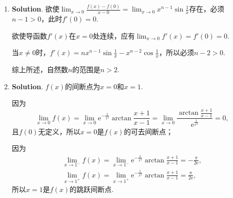 \documentclass[../main.tex]{subfiles}
\begin{document}
\begin{enumerate}
    \item \textbf{Solution}. 欲使$\lim_{x\to0}\frac{f(x)-f(0)}{x-0}=\lim_{x\to0}x
                  ^{n-1}\sin\frac{1}{x}$存在，必须$n-1>0$，此时$f'(0)=0$.

          欲使导函数$f'(x)$在$x=0$处连续，应有$\lim_{x\to0}f'(x)=f'(0)=0$.

          当$x\neq0$时，$f'(x)=nx^{n-1}\sin\frac{1}{x}-x^{n-2}\cos\frac{1}{x}$，所以必须$n
              -2>0$.

          综上所述，自然数$n$的范围是$n>2$.

    \item \textbf{Solution}. $f(x)$的间断点为$x=0$和$x=1$.

          因为
          \[\lim_{x\to0}f(x)=\lim_{x\to0}\mathrm{e}^{-\frac{1}{x^{2}}}\arctan\frac{x+1}{x-1}
              =\lim_{x\to0}\frac{\arctan\frac{x+1}{x-1}}{\mathrm{e}^{\frac{1}{x^2}}}=0,
          \]
          且$f(0)$无定义，所以$x=0$是$f(x)$的可去间断点；

          因为
          \[
              \begin{gathered}
                  \lim_{x\to1^-}f(x)=\lim_{x\to1^-}\mathrm{e}^{-\frac{1}{x^{2}}}\arctan\frac{x+1}{x-1}
                  =-\frac{\pi}{2\mathrm{e}},\\
                  \lim_{x\to1^+}f(x)=\lim_{x\to1^+}\mathrm{e}^{-\frac{1}{x^{2}}}
                  \arctan\frac{x+1}{x-1}=\frac{\pi}{2\mathrm{e}},
              \end{gathered}
          \]
          所以$x=1$是$f(x)$的跳跃间断点.
\end{enumerate}
\end{document}
